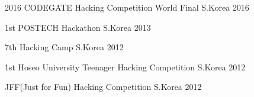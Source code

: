 

\begin{cvhonours}

	{2016 CODEGATE Hacking Competition World Final} %
	{S.Korea} %
	{2016} %

	{1st POSTECH Hackathon} %
	{S.Korea} %
	{2013} %

	{7th Hacking Camp} %
	{S.Korea} %
	{2012} %

	{1st Hoseo University Teenager Hacking Competition} %
	{S.Korea} %
	{2012} %

	{JFF(Just for Fun) Hacking Competition} %
	{S.Korea} %
	{2012} %

\end{cvhonours}
